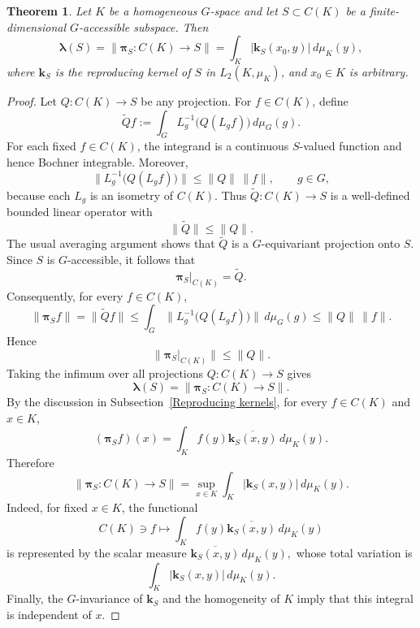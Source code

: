 \documentclass[11pt,showkeys]{amsart}
\newtheorem{theorem}{Theorem}[section]
\begin{document}
\begin{theorem}\label{thm:accessible-projection-constant}
Let \(K\) be a homogeneous \(G\)-space and let \(S\subset C(K)\) be a
finite-dimensional \(G\)-accessible subspace. Then
\[
        \boldsymbol\lambda(S)
        =
        \|\mathbf \pi_S\colon C(K)\to S\|
        =
        \int_K
        \bigl|\mathbf{k}_S(x_0,y)\bigr|
        \,d\mu_K(y),
\]
where \(\mathbf{k}_S\) is the reproducing kernel of \(S\) in
\(L_2(K,\mu_K)\), and \(x_0\in K\) is arbitrary.
\end{theorem}

\begin{proof}
Let \(Q\colon C(K)\to S\) be any projection. For \(f\in C(K)\), define
\[
        \widetilde Qf
        :=
        \int_G
        L_g^{-1}\bigl(Q(L_gf)\bigr)
        \,d\mu_G(g).
\]
For each fixed \(f\in C(K)\), the integrand is a continuous
\(S\)-valued function and hence Bochner integrable. Moreover,
\[
        \bigl\|L_g^{-1}\bigl(Q(L_gf)\bigr)\bigr\|
        \le
        \|Q\|\,\|f\|,
        \qquad g\in G,
\]
because each \(L_g\) is an isometry of \(C(K)\). Thus
\(\widetilde Q\colon C(K)\to S\) is a well-defined bounded linear
operator with
\[
        \|\widetilde Q\|\le \|Q\|.
\]
The usual averaging argument shows that \(\widetilde Q\) is a
\(G\)-equivariant projection onto \(S\). Since \(S\) is
\(G\)-accessible, it follows that
\[
        \mathbf\pi_S|_{C(K)}
        =
        \widetilde Q.
\]
Consequently, for every \(f\in C(K)\),
\begin{equation*}
        \|\mathbf\pi_Sf\|
        =
        \|\widetilde Qf\| 
        \le
        \int_G
        \bigl\|L_g^{-1}\bigl(Q(L_gf)\bigr)\bigr\|
        \,d\mu_G(g) 
        \le
        \|Q\|\,\|f\|.
\end{equation*}
Hence
\[
        \|\mathbf\pi_S|_{C(K)}\|
        \le
        \|Q\|.
\]
Taking the infimum over all projections \(Q\colon C(K)\to S\) gives
\[
        \boldsymbol\lambda(S)
        =
        \|\mathbf\pi_S\colon C(K)\to S\|.
\]
By the discussion in Subsection~\ref{Reproducing kernels}, for every
\(f\in C(K)\) and \(x\in K\),
\[
        (\mathbf\pi_Sf)(x)
        =
        \int_K
        f(y)\overline{\mathbf k_S(x,y)}
        \,d\mu_K(y).
\]
Therefore
\[
        \|\mathbf\pi_S\colon C(K)\to S\|
        =
        \sup_{x\in K}
        \int_K
        \bigl|\mathbf k_S(x,y)\bigr|
        \,d\mu_K(y).
\]
Indeed, for fixed \(x\in K\), the functional
\[
        C(K) \ni f\longmapsto
        \int_K
        f(y)\overline{\mathbf k_S(x,y)}
        \,d\mu_K(y)
\]
is represented by the scalar measure
\(
        \overline{\mathbf k_S(x,y)}\,d\mu_K(y),
\)
whose total variation is
\[
        \int_K
        \bigl|\mathbf k_S(x,y)\bigr|
        \,d\mu_K(y).
\]
Finally, the \(G\)-invariance of \(\mathbf k_S\) and the homogeneity of
\(K\) imply that this integral is independent of \(x\).
\end{proof}
\end{document}
